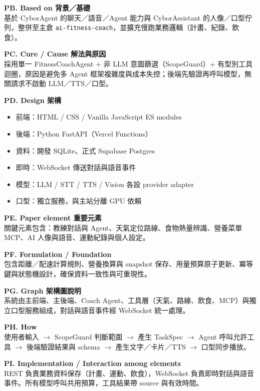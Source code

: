 \documentclass[12pt,a4paper]{article}
\begin{document}
\textbf{PB. Based on 背景／基礎} \\
基於 CyborAgent 的聊天／語音／Agent 能力與 CyborAssistant 的人像／口型佇列，整併至主倉 \texttt{ai-fitness-coach}，並擴充慢跑業務邏輯（計畫、紀錄、飲食）。

\textbf{PC. Cure / Cause 解法與原因} \\
採用單一 FitnessCoachAgent + 非 LLM 意圖篩選（ScopeGuard）+ 有型別工具迴圈，原因是避免多 Agent 框架複雜度與成本失控；後端先驗證再呼叫模型，無關請求不啟動 LLM／TTS／口型。

\textbf{PD. Design 架構} \\
\begin{itemize}[leftmargin=*]
\item 前端：HTML / CSS / Vanilla JavaScript ES modules
\item 後端：Python FastAPI（Vercel Functions）
\item 資料：開發 SQLite、正式 Supabase Postgres
\item 即時：WebSocket 傳送對話與語音事件
\item 模型：LLM / STT / TTS / Vision 各設 provider adapter
\item 口型：獨立服務，與主站分離 GPU 依賴
\end{itemize}

\textbf{PE. Paper element 重要元素} \\
關鍵元素包含：教練對話與 Agent、天氣定位路線、食物熱量辨識、營養菜單 MCP、AI 人像與語音、運動紀錄與個人設定。

\textbf{PF. Formulation / Foundation} \\
包含距離／配速計算規則、營養換算與 snapshot 保存、用量預算原子更新、冪等鍵與狀態機設計，確保資料一致性與可重現性。

\textbf{PG. Graph 架構圖說明} \\
系統由主前端、主後端、Coach Agent、工具層（天氣、路線、飲食、MCP）與獨立口型服務組成，對話與語音事件經 WebSocket 統一處理。

\textbf{PH. How} \\
使用者輸入 $\rightarrow$ ScopeGuard 判斷範圍 $\rightarrow$ 產生 TaskSpec $\rightarrow$ Agent 呼叫允許工具 $\rightarrow$ 後端驗證結果與 schema $\rightarrow$ 產生文字／卡片／TTS $\rightarrow$ 口型同步播放。

\textbf{PI. Implementation / Interaction among elements} \\
REST 負責業務資料保存（計畫、運動、飲食），WebSocket 負責即時對話與語音事件。所有模型呼叫共用預算，工具結果帶 source 與有效時間。
\end{document}
